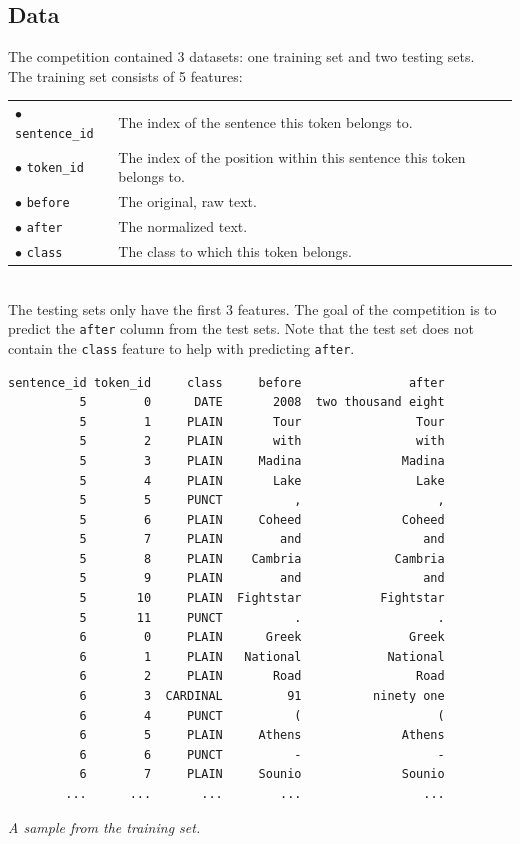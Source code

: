 \documentclass[a4paper, 9pt]{extarticle}
\newcommand{\code}{\texttt}
\begin{document}
\subsection{Data}
The competition contained 3 datasets: one training set and two testing sets.\\
The training set consists of 5 features:\\
\begin{tabular}{ll}
$\bullet$ \code{sentence\_id} & The index of the sentence this token belongs to. \\
$\bullet$ \code{token\_id} & The index of the position within this sentence this token belongs to.\\
$\bullet$ \code{before} & The original, raw text.\\
$\bullet$ \code{after} & The normalized text.\\
$\bullet$ \code{class} & The class to which this token belongs. \\
\end{tabular}\\
The testing sets only have the first 3 features. The goal of the competition is to predict the \code{after} column from the test sets. Note that the test set does not contain the \code{class} feature to help with predicting \code{after}.
\begin{minipage}[t]{0.5\textwidth}
\begin{lstlisting}[linewidth=26em]
sentence_id token_id     class     before               after
          5        0      DATE       2008  two thousand eight
          5        1     PLAIN       Tour                Tour
          5        2     PLAIN       with                with
          5        3     PLAIN     Madina              Madina
          5        4     PLAIN       Lake                Lake
          5        5     PUNCT          ,                   ,
          5        6     PLAIN     Coheed              Coheed
          5        7     PLAIN        and                 and
          5        8     PLAIN    Cambria             Cambria
          5        9     PLAIN        and                 and
          5       10     PLAIN  Fightstar           Fightstar
          5       11     PUNCT          .                   .
          6        0     PLAIN      Greek               Greek
          6        1     PLAIN   National            National
          6        2     PLAIN       Road                Road
          6        3  CARDINAL         91          ninety one
          6        4     PUNCT          (                   (
          6        5     PLAIN     Athens              Athens
          6        6     PUNCT          -                   -
          6        7     PLAIN     Sounio              Sounio
        ...      ...       ...        ...                 ...
\end{lstlisting}
\textit{A sample from the training set.}
\end{minipage}
\end{document}
